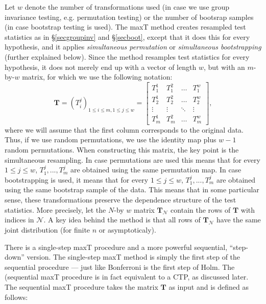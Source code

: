 \documentclass[11pt]{article}
\theoremstyle{plain}
\theoremstyle{definition}
\newcommand{\N}{\mathcal{N}}
\begin{document}
Let $w$ denote the number of transformations used (in case we use   group invariance testing, e.g. permutation testing) or the number of bootsrap samples (in case bootstrap testing is used). 
The maxT method creates resampled test statistics  as in \S\ref{secgroupinv} and \S\ref{secboot}, except that it does this for every hypothesis, and it applies \emph{simultaneous permutation} or \emph{simultaneous bootstrapping} (further explained below). Since the method resamples test statistics for every hypothesis, it does not merely end up with a vector of length $w$, but with an $m$-by-$w$ matrix, for which we use the following notation:
\begin{equation} \label{eq:matrixT}
\bm{T} = (T_i^j)_{1\leq i \leq m, 1\leq j \leq w}=
\begin{bmatrix}
T_1^1 & T_1^2 & \ldots & T_1^w \\
T_2^1 & T_2^2  &  \ldots & T_2^w \\
\vdots & \vdots & \ddots & \vdots \\
T_m^1 & T_m^2  & \ldots & T_m^w
\end{bmatrix}
,
\end{equation}
where we will assume that the first column corresponds to the original data. Thus, if we use random permutations,  we use the identity map plus $w-1$ random permutations.
When constructing this matrix, the key point is the simultaneous resampling. In case permutations are used this means that for every $1\leq j \leq w$, $T_1^j,...,T_m^j$ are obtained using the same permutation map.  In case bootstrapping is used, it means that for every $1\leq j \leq w$, $T_1^j,...,T_m^j$ are obtained using the same bootstrap sample of the data. This means that in some particular sense, these transformations preserve the dependence structure of the test statistics. More precisely, let the $N$-by $w$ matrix $\bm{T}_{\N}$ contain the rows of $\bm{T}$ with indices in $\N$. A key idea behind the method is that all rows of $\bm{T}_{\N}$ have the same joint distribution  (for finite $n$ or asymptoticaly).

There is a single-step maxT procedure and a more powerful sequential, ``step-down'' version. The single-step maxT method is simply  the first step of the sequential procedure --- just like Bonferroni is the first step of Holm.
The (sequential maxT procedure is in fact equivalent to a CTP, as discussed later.
The  sequential maxT procedure takes the matrix $\bm{T}$ as input and is defined as follows:

\end{document}
